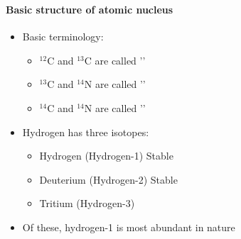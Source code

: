 \begin{frame}
\frametitle{\texorpdfstring{\culine[\sectiontitleulinecolor]{\sectiontitle}}{\sectiontitle} }
\framesubtitle{Basic structure of atomic nucleus}

\begin{minipage}{6.5cm}
\begin{itemize} \seminormal
\item Basic terminology:
	\begin{itemize}
	 \item ${ }^{12} \mathrm{C}$ and ${ }^{13} \mathrm{C}$ are called '' 
	\item ${ }^{13} \mathrm{C}$ and ${ }^{14} \mathrm{N}$ are called '' 
	\item ${ }^{14} \mathrm{C}$ and ${ }^{14} \mathrm{N}$ are called ''
\end{itemize}

	
	\item Hydrogen has three isotopes:
	\begin{itemize}
		\item Hydrogen (Hydrogen-1) Stable
		\item Deuterium (Hydrogen-2) Stable
		\item Tritium (Hydrogen-3) 	
	\end{itemize}

\item Of these, hydrogen-1 is most abundant in nature  

\end{itemize}
\end{minipage}




\end{frame}
